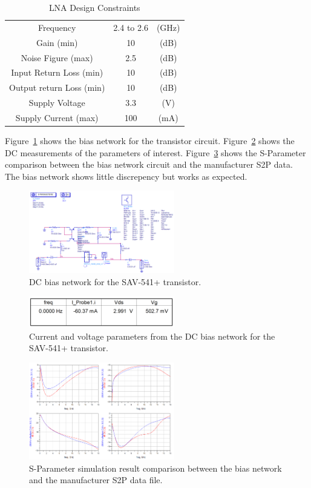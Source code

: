 \documentclass[conference]{IEEEtran}
\begin{document}
\begin{table}[!b]
\caption{LNA Design Constraints}
\centering
    \begin{tabular}{c c c}
    
  	Frequency & 2.4 to 2.6 & (GHz)\\
	Gain (min) & 10 & (dB)\\
	Noise Figure (max) & 2.5 & (dB)\\
	Input Return Loss (min) & 10 & (dB)\\
	Output return Loss (min) & 10 & (dB)\\
	Supply Voltage & 3.3 & (V)\\
	Supply Current (max) & 100 & (mA)\\
    \end{tabular}
\label{tab:specs}
\end{table}

Figure~\ref{fig:dccircuit} shows the bias network for the transistor circuit.  Figure~\ref{fig:dcvalues} shows the DC measurements of the parameters of interest.  Figure~\ref{fig:sparamresult} shows the S-Parameter comparison between the bias network circuit and the manufacturer S2P data.  The bias network shows little discrepency but works as expected.

\begin{figure}[!h]
\centering
\includegraphics[width=2.5in]{pics/DCBiasNetwork.png}
\caption{DC bias network for the SAV-541+ transistor.}
\label{fig:dccircuit}
\end{figure}

\begin{figure}[!h]
\centering
\includegraphics[width=2.5in]{pics/DCBiasResults.png}
\caption{Current and voltage  parameters from the DC bias network for the SAV-541+ transistor.}
\label{fig:dcvalues}
\end{figure}

\begin{figure}[!h]
\centering
\includegraphics[width=2.5in]{pics/SParameterComparison.png}
\caption{S-Parameter simulation result comparison between the bias network and the manufacturer S2P data file.}
\label{fig:sparamresult}
\end{figure}
\end{document}
